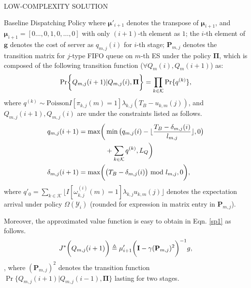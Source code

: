 \documentclass[10pt, conference, letterpaper]{IEEEtran}
\newcommand{\mat}{\mathbf}
\newcommand{\Poisson}{\text{Poisson}}
\newcommand{\define}{\triangleq}
\renewcommand{\vec}{\mathbf}
\DeclarePairedDelimiter{\Paren}{\bigg(}{\bigg)}
\DeclarePairedDelimiter{\Brace}{\bigg\{}{\bigg\}}
\newcommand{\apSet}{\mathcal{K}}
\newcommand{\Obsv}{\mathcal{Y}}
\begin{document}
\begin{section}{LOW-COMPLEXITY SOLUTION}
\begin{subsection}{Baseline Dispatching Policy}
            where $\vec{\mu}'_{i+1}$ denotes the transpose of $\vec{\mu}_{i+1}$, and $\vec{\mu}_{i+1} = [0\dots,0,1,0,\dots,0]$ with only $(i+1)$-th element as $1$; the $i$-th element of $\vec{g}$ denotes the cost of server as $q_{m,j}(i)$ for $i$-th stage; $\mat{P}_{m,j}$ denotes the transition matrix for $j$-type FIFO queue on $m$-th ES under the policy $\vec{\Pi}$, which is composed of the following transition function ($\forall Q_m(i),Q_m(i+1)$) as:
            \begin{align}
                \Pr \Brace{Q_{m,j}(i+1)|Q_{m,j}(i),\vec{\Pi}} = \prod_{k\in\apSet} \Pr\{q^{(k)}\},
            \end{align}
            where $q^{(k)} \sim \Poisson{I[\pi_{k,j}(m)=1]\lambda_{k,j}(T_B-u_{k,m}(j))}$, and $Q_{m,j}(i+1), Q_{m,j}(i)$ are under the constraints listed as follows.
            \begin{align}
                q_{m,j}(i+1) = \max\Paren{
                    &\min\big(q_{m,j}(i) - \lfloor{\frac{T_B-\delta_{m,j}(i)}{l_{m,j}}}\rfloor, 0\big)
                    \nonumber\\
                    &+\sum_{k\in\apSet} q^{(k)}, L_Q
                }
                \\
                \delta_{m,j}(i+1) = \max\Paren{
                    &\big(T_B - \delta_{m,j}(i)\big) \text{ mod } l_{m,j}, 0
                },
            \end{align}
            where $q'_0 = \sum_{k\in\apSet} \lfloor{I[\omega^{(i)}_{k,j}(m)=1] \lambda_{k,j} u_{k,m}(j)}\rfloor$ denotes the expectation arrival under policy $\Omega(\Obsv_i)$ (rounded for expression in matrix entry in $\mat{P}_{m,j}$).
            
            Moreover, the approximated value function is easy to obtain in Eqn. \ref{sp1} as follows.
            \begin{align}
                J^{*}\Paren{Q_{m,j}(i+1)} \define \mu'_{i+1} \Paren{\mat{I} - \gamma (\mat{P}_{m,j})^{2}}^{-1} g,
            \end{align},
            where $(\mat{P}_{m,j})^{2}$ denotes the transition function $\Pr\{Q_{m,j}(i+1)|Q_{m,j}(i-1), \vec{\Pi}\}$ lasting for two stages.
        \end{subsection}


\end{section}
\end{document}
